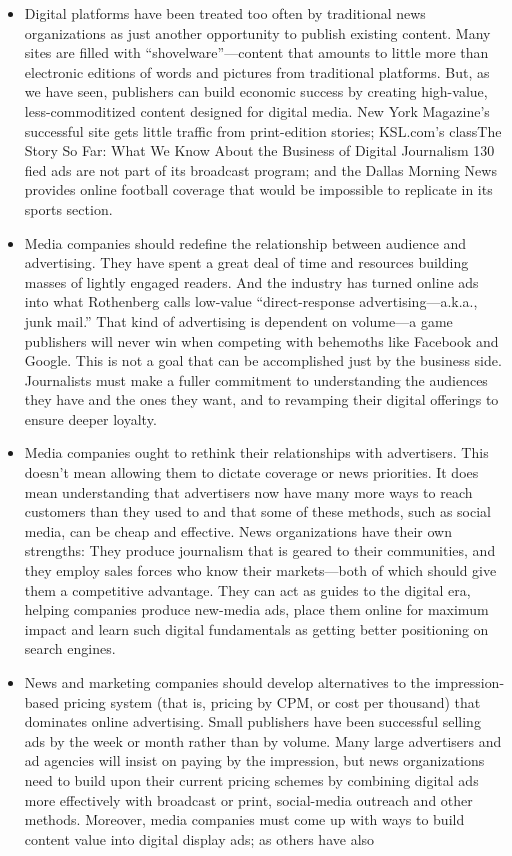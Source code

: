 \begin{itemize}
\item Digital platforms have been treated too often by traditional news organizations
as just another opportunity to publish existing content. Many sites are
filled with ``shovelware''—content that amounts to little more than electronic
editions of words and pictures from traditional platforms. But, as we
have seen, publishers can build economic success by creating high-value,
less-commoditized content designed for digital media. New York Magazine's
successful site gets little traffic from print-edition stories; KSL.com's classThe
Story So Far: What We Know About the Business of Digital Journalism
130
fied ads are not part of its broadcast program; and the Dallas Morning News
provides online football coverage that would be impossible to replicate in its
sports section.
\item Media companies should redefine the relationship between audience and
advertising. They have spent a great deal of time and resources building
masses of lightly engaged readers. And the industry has turned online ads
into what Rothenberg calls low-value ``direct-response advertising—a.k.a.,
junk mail.'' That kind of advertising is dependent on volume—a game publishers
will never win when competing with behemoths like Facebook and
Google. This is not a goal that can be accomplished just by the business side.
Journalists must make a fuller commitment to understanding the audiences
they have and the ones they want, and to revamping their digital offerings to
ensure deeper loyalty.
\item Media companies ought to rethink their relationships with advertisers. This
doesn't mean allowing them to dictate coverage or news priorities. It does
mean understanding that advertisers now have many more ways to reach
customers than they used to and that some of these methods, such as social
media, can be cheap and effective. News organizations have their own
strengths: They produce journalism that is geared to their communities, and
they employ sales forces who know their markets—both of which should
give them a competitive advantage. They can act as guides to the digital era,
helping companies produce new-media ads, place them online for maximum
impact and learn such digital fundamentals as getting better positioning
on search engines.
\item News and marketing companies should develop alternatives to the impression-
based pricing system (that is, pricing by CPM, or cost per thousand)
that dominates online advertising. Small publishers have been successful
selling ads by the week or month rather than by volume. Many large advertisers
and ad agencies will insist on paying by the impression, but news
organizations need to build upon their current pricing schemes by combining
digital ads more effectively with broadcast or print, social-media
outreach and other methods. Moreover, media companies must come up
with ways to build content value into digital display ads; as others have also


\end{itemize}
